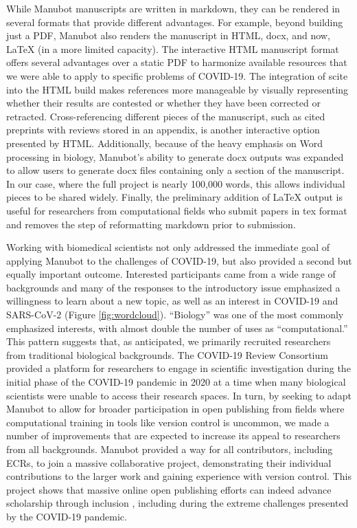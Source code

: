 \documentclass[sigconf]{acmart}
\begin{document}
While Manubot manuscripts are written in markdown, they can be rendered in several formats that provide different advantages.
For example, beyond building just a PDF, Manubot also renders the manuscript in HTML, docx, and now, LaTeX (in a more limited capacity).
The interactive HTML manuscript format offers several advantages over a static PDF to harmonize available resources that we were able to apply to specific problems of COVID-19.
The integration of scite into the HTML build makes references more manageable by visually representing whether their results are contested or whether they have been corrected or retracted.
Cross-referencing different pieces of the manuscript, such as cited preprints with reviews stored in an appendix, is another interactive option presented by HTML.
Additionally, because of the heavy emphasis on Word processing in biology, Manubot's ability to generate docx outputs was expanded to allow users to generate docx files containing only a section of the manuscript.
In our case, where the full project is nearly 100,000 words, this allows individual pieces to be shared widely.
Finally, the preliminary addition of LaTeX output is useful for researchers from computational fields who submit papers in tex format and removes the step of reformatting markdown prior to submission.

Working with biomedical scientists not only addressed the immediate goal of applying Manubot to the challenges of COVID-19, but also provided a second but equally important outcome.
Interested participants came from a wide range of backgrounds and many of the responses to the introductory issue emphasized a willingness to learn about a new topic, as well as an interest in COVID-19 and SARS-CoV-2 (Figure \ref{fig:wordcloud}).
``Biology'' was one of the most commonly emphasized interests, with almost double the number of uses as ``computational.''
This pattern suggests that, as anticipated, we primarily recruited researchers from traditional biological backgrounds.
The COVID-19 Review Consortium provided a platform for researchers to engage in scientific investigation during the initial phase of the COVID-19 pandemic in 2020 at a time when many biological scientists were unable to access their research spaces.
In turn, by seeking to adapt Manubot to allow for broader participation in open publishing from fields where computational training in tools like version control is uncommon, we made a number of improvements that are expected to increase its appeal to researchers from all backgrounds.
Manubot provided a way for all contributors, including ECRs, to join a massive collaborative project, demonstrating their individual contributions to the larger work and gaining experience with version control.
This project shows that massive online open publishing efforts can indeed advance scholarship through inclusion \citep{PoDz2q0A}, including during the extreme challenges presented by the COVID-19 pandemic.
\end{document}
